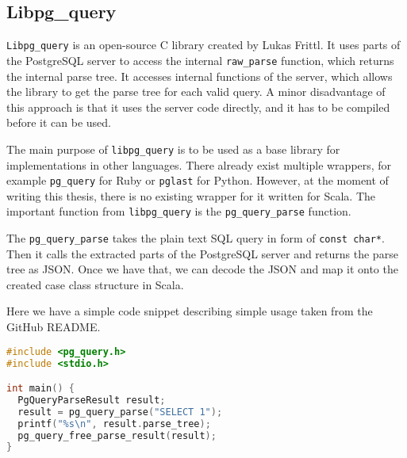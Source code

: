 \subsection{Libpg\_query}
\texttt{Libpg\_query} is an open-source C library created by Lukas Frittl. It uses parts of the PostgreSQL server to access the internal \texttt{raw\_parse} function, which returns the internal parse tree. It accesses internal functions of the server, which allows the library to get the parse tree for each valid query. A minor disadvantage of this approach is that it uses the server code directly, and it has to be compiled before it can be used.

The main purpose of \texttt{libpg\_query} is to be used as a base library for implementations in other languages. There already exist multiple wrappers, for example \texttt{pg\_query} for Ruby or \texttt{pglast} for Python. However, at the moment of writing this thesis, there is no existing wrapper for it written for Scala. The important function from \texttt{libpg\_query} is the \texttt{pg\_query\_parse} function.

The \texttt{pg\_query\_parse} takes the plain text SQL query in form of \texttt{const char*}. Then it calls the extracted parts of the PostgreSQL server and returns the parse tree as JSON. Once we have that, we can decode the JSON and map it onto the created case class structure in Scala.

Here we have a simple code snippet describing simple usage taken from the GitHub README\cite{libpgquery}. 

\begin{lstlisting}[language=C, basicstyle=\ttfamily, keywordstyle=\color{purple}]
#include <pg_query.h>
#include <stdio.h>

int main() {
  PgQueryParseResult result;
  result = pg_query_parse("SELECT 1");
  printf("%s\n", result.parse_tree);
  pg_query_free_parse_result(result);
}
\end{lstlisting}